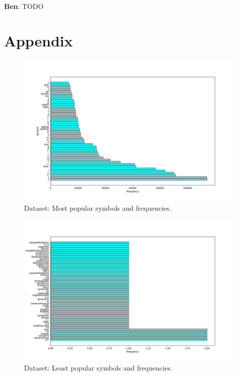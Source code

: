 \documentclass{article}
\begin{document}
\textbf{Ben}: TODO


\medskip

\nocite{*}

\small


\section{Appendix}

\begin{figure}[H]
    \centering
    \includegraphics[scale=0.4]{fig_vocabs_frequency_1.png}
    \caption{Dataset: Most popular symbols and frequencies.}
    \label{fig:vocab_freq_1}
\end{figure}

\begin{figure}[H]
    \centering
    \includegraphics[scale=0.4]{fig_vocabs_frequency_2.png}
    \caption{Dataset: Least popular symbols and frequencies.}
    \label{fig:vocab_freq_2}
\end{figure}
\end{document}
